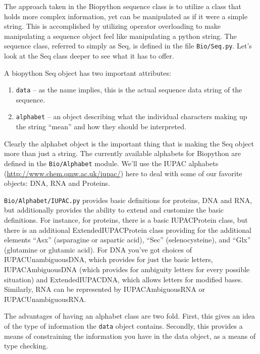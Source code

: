 \documentclass{report}
\begin{document}
The approach taken in the Biopython sequence class is to utilize a class that holds more complex information, yet can be manipulated as if it were a simple string. This is accomplished by utilizing operator overloading to make manipulating a sequence object feel like manipulating a python string. The sequence class, referred to simply as Seq,  is defined in the file \verb|Bio/Seq.py|. Let's look at the Seq class deeper to see what it has to offer.


A biopython Seq object has two important attributes:

\begin{enumerate}

\item \verb|data| -- as the name implies, this is the actual sequence data string of the sequence.

\item \verb|alphabet| -- an object describing what the individual characters making up the string ``mean'' and how they should be interpreted.

\end{enumerate}

Clearly the alphabet object is the important thing that is making the Seq object more than just a string. The currently available alphabets for Biopython are defined in the \verb|Bio/Alphabet| module. We'll use the IUPAC alphabets (\url{http://www.chem.qmw.ac.uk/iupac/}) here to deal with some of our favorite objects: DNA, RNA and Proteins.  


\verb|Bio/Alphabet/IUPAC.py| provides basic definitions for proteins, DNA and RNA, but additionally provides the ability to extend and customize the basic definitions. For instance, for proteins, there is a basic IUPACProtein class, but there is an additional ExtendedIUPACProtein class providing for the additional elements ``Asx'' (asparagine or aspartic acid), ``Sec'' (selenocysteine), and ``Glx'' (glutamine or glutamic acid). For DNA you've got choices of IUPACUnambiguousDNA, which provides for just the basic letters, IUPACAmbiguousDNA (which provides for ambiguity letters for every possible situation) and ExtendedIUPACDNA, which allows letters for modified bases. Similarly, RNA can be represented by IUPACAmbiguousRNA or IUPACUnambiguousRNA.


The advantages of having an alphabet class are two fold. First, this gives an idea of the type of information the \verb|data| object contains. Secondly, this provides a means of constraining the information you have in the data object, as a means of type checking.
\end{document}
